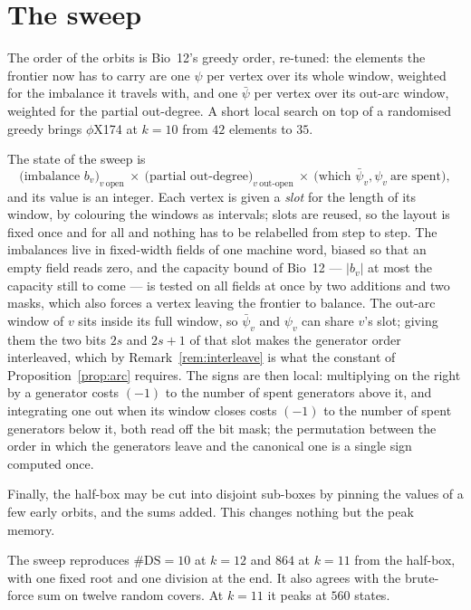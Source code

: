 \documentclass[11pt]{article}
\theoremstyle{plain}
\theoremstyle{definition}
\theoremstyle{remark}
\newcommand{\DS}{\mathrm{DS}}
\newcommand{\bpsi}{\bar\psi}
\begin{document}
\section{The sweep}\label{sec:sweep}

The order of the orbits is Bio~12's greedy order, re-tuned: the elements the frontier now has
to carry are one $\psi$ per vertex over its whole window, weighted for the imbalance it travels
with, and one $\bpsi$ per vertex over its out-arc window, weighted for the partial out-degree.
A short local search on top of a randomised greedy brings $\phi$X174 at $k=10$ from $42$
elements to $35$.

The state of the sweep is
\[
\big(\text{imbalance }b_v\big)_{v\ \text{open}}\ \times\
\big(\text{partial out-degree}\big)_{v\ \text{out-open}}\ \times\
\big(\text{which }\bpsi_v,\psi_v\ \text{are spent}\big),
\]
and its value is an integer. Each vertex is given a \emph{slot} for the length of its window, by
colouring the windows as intervals; slots are reused, so the layout is fixed once and for all
and nothing has to be relabelled from step to step. The imbalances live in fixed-width fields of
one machine word, biased so that an empty field reads zero, and the capacity bound of Bio~12
---
$|b_v|$ at most the capacity still to come --- is tested on all fields at once by two additions
and two masks, which also forces a vertex leaving the frontier to balance. The out-arc window of
$v$ sits inside its full window, so $\bpsi_v$ and $\psi_v$ can share $v$'s slot; giving them the
two bits $2s$ and $2s+1$ of that slot makes the generator order interleaved, which by
Remark~\ref{rem:interleave} is what the constant of Proposition~\ref{prop:arc} requires. The
signs are then local: multiplying on the right by a generator costs $(-1)$ to the number of
spent generators above it, and integrating one out when its window closes costs $(-1)$ to the
number of spent generators below it, both read off the bit mask; the permutation between the
order in which the generators leave and the canonical one is a single sign computed once.

Finally, the half-box may be cut into disjoint sub-boxes by pinning the values of a few early
orbits, and the sums added. This changes nothing but the peak memory.

The sweep reproduces $\#\DS=10$ at $k=12$ and $864$ at $k=11$ from the half-box, with one
fixed root and one division at the end. It also agrees with the brute-force sum on twelve
random covers. At $k=11$ it peaks at $560$ states.
\end{document}
